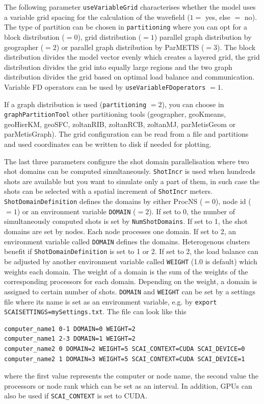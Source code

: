 \documentclass[pdftex,a4paper,parskip,listof=totoc,bibliography=totoc,onehalfspacing,12pt]{scrreprt}
\newcommand{\shellcmd}[1]{\indent\indent\texttt{#1}}	%
\begin{document}
The following parameter \verb+useVariableGrid+ characterises whether the model uses a variable grid spacing for the calculation of the wavefield ($1=$ yes, else $=$ no). 
The type of partition can be chosen in \verb+partitioning+ where you can opt for a block distribution ($=0$), grid distribution ($=1$) parallel graph distribution by geographer ($=2$) or parallel graph distribution by ParMETIS ($=3$).
The block distribution divides the model vector evenly which creates a layered grid, the grid distribution divides the grid into equally large regions and the two graph distribution divides the grid based on optimal load balance and communication.
Variable FD operators can be used by \verb+useVariableFDoperators+ $=1$.

If a graph distribution is used (\verb+partitioning+ $=2$), you can choose in \verb+graphPartitionTool+ other partitioning tools (geographer, geoKmeans, geoHierKM, geoSFC, zoltanRIB, zoltanRCB, zoltanMJ, parMetisGeom or parMetisGraph).
The grid configuration can be read from a file and partitions and used coordinates can be written to disk if needed for plotting.

The last three parameters configure the shot domain parallelisation where two shot domains can be computed simultaneously. 
\verb+ShotIncr+ is used when hundreds shots are available but you want to simulate only a part of them, in such case the shots can be selected with a spatial increment of \verb+ShotIncr+ meters.
\verb+ShotDomainDefinition+ defines the domains by either ProcNS ($=0$), node id ($=1$) or an environment variable \shellcmd{DOMAIN} ($=2$).
If set to 0, the number of simultaneously computed shots is set by \verb+NumShotDomains+. If set to 1, the shot domains are set by nodes. Each node processes one domain. If set to 2, an environment variable called \shellcmd{DOMAIN} defines the domains.
Heterogenous clusters benefit if \verb+ShotDomainDefinition+ is set to 1 or 2. If set to 2, the load balance can be adjusted by another environment variable called \shellcmd{WEIGHT} (1.0 is default) which weights each domain. 
The weight of a domain is the sum of the weights of the corresponding processors for each domain. Depending on the weight, a domain is assigned to certain number of shots.
\shellcmd{DOMAIN} and \shellcmd{WEIGHT} can be set by a settings file where its name is set as an environment variable, e.g. by \shellcmd{export SCAISETTINGS=mySettings.txt}.
The file can look like this 
\begin{verbatim}
computer_name1 0-1 DOMAIN=0 WEIGHT=2
computer_name1 2-3 DOMAIN=1 WEIGHT=2
computer_name2 0 DOMAIN=2 WEIGHT=5 SCAI_CONTEXT=CUDA SCAI_DEVICE=0
computer_name2 1 DOMAIN=3 WEIGHT=5 SCAI_CONTEXT=CUDA SCAI_DEVICE=1
\end{verbatim}
where the first value represents the computer or node name, the second value the processors or node rank which can be set as an interval. In addition, GPUs can also be used if \shellcmd{SCAI\_CONTEXT} is set to CUDA.
\end{document}

